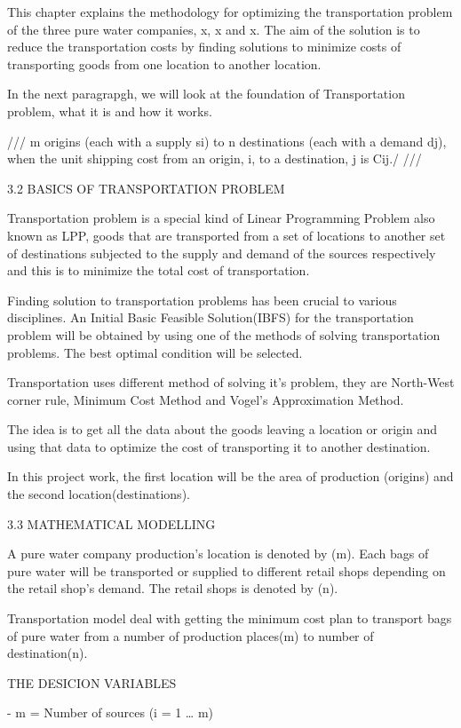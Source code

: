 \documentclass{article}
\begin{document}
This chapter explains the methodology for optimizing the transportation problem of the three pure water companies, x, x and x.
The aim of the solution is to reduce the transportation costs by finding solutions to minimize costs of transporting goods from one location to another location.

In the next paragrapgh, we will look at the foundation of Transportation problem, what it is and how it works.

/// m origins (each with a supply si) to n destinations (each with a demand dj), when the unit shipping cost from an origin, i, to a destination, j is Cij./ ///

3.2 BASICS OF TRANSPORTATION PROBLEM

Transportation problem is a special kind of Linear Programming Problem also known as LPP, goods that are transported from a set of locations to another set of destinations subjected to the supply and demand of the sources respectively and this is to minimize the total cost of transportation.

Finding solution to transportation problems has been crucial to various disciplines. An Initial Basic Feasible Solution(IBFS) for the transportation problem will be obtained by using one of the methods of solving transportation problems. The best optimal condition will be selected.

Transportation uses different method of solving it's problem, they are North-West corner rule, Minimum Cost Method and Vogel’s Approximation Method.

The idea is to get all the data about the goods leaving a location or origin and using that data to optimize the cost of transporting it to another destination.

In this project work, the first location will be the area of production (origins) and the second location(destinations).

3.3 MATHEMATICAL MODELLING

A pure water company production's location is denoted by (m). Each bags of pure water will be transported or supplied to different retail shops depending on the retail shop's demand. The retail shops is denoted by (n).

Transportation model deal with getting the minimum cost plan to transport bags of pure water from a number of production places(m) to number of destination(n).

THE DESICION VARIABLES

- m = Number of sources (i = 1 … m)
\end{document}
